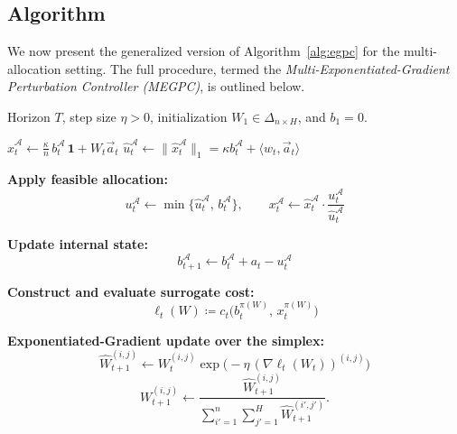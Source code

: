 \documentclass[11pt]{article}
\begin{document}
\subsection{Algorithm}

We now present the generalized version of Algorithm~\ref{alg:egpc} for the multi-allocation setting.  
The full procedure, termed the \emph{Multi-Exponentiated-Gradient Perturbation Controller (MEGPC)}, is outlined below.

\begin{algorithm}
\caption{Multi-Exponentiated-Gradient Perturbation Controller (MEGPC)}
\label{alg:megpc}
\begin{algorithmic}[1]
\Require Horizon \(T\), step size \(\eta > 0\), initialization \(W_1 \in \Delta_{n\times H}\), and \(b_1 = 0\).


    \State 
    \(
        \widehat{x}_t^{\mathcal{A}} 
        \gets
        \frac{\kappa}{n}\, b_t^{\mathcal{A}}\, \mathbf{1}
        +
        W_t \vec{a}_t
    \)
    \State
    \(
        \widehat{u}_t^{\mathcal{A}} 
        \gets
        \|\widehat{x}_t^{\mathcal{A}}\|_1
        =
        \kappa b_t^{\mathcal{A}} + \langle w_t , \vec{a}_t\rangle
    \)

    \State \textbf{Apply feasible allocation:}
    \[
        u_t^{\mathcal{A}} \gets \min\{\widehat{u}_t^{\mathcal{A}},\, b_t^{\mathcal{A}}\},
        \qquad
        x_t^{\mathcal{A}} \gets
        \widehat{x}_t^{\mathcal{A}} \cdot
        \frac{u_t^{\mathcal{A}}}{\widehat{u}_t^{\mathcal{A}}}
    \]

    \State \textbf{Update internal state:}
    \[
        b_{t+1}^{\mathcal{A}} \gets b_t^{\mathcal{A}} + a_t - u_t^{\mathcal{A}}
    \]

    \State \textbf{Construct and evaluate surrogate cost:}
    \[
        \ell_t(W)
        \coloneqq
        c_t\!\bigl(b_t^{\pi(W)},\,x_t^{\pi(W)}\bigr)
    \]

    \State \textbf{Exponentiated-Gradient update over the simplex:}
        \[
            \widehat{W}_{t+1}^{(i,j)} 
            \gets
            W_t^{(i,j)} 
            \exp\!\big(-\eta\, (\nabla \ell_t(W_t))^{(i,j)}\big)
        \]
    \EndFor
    \[
        W_{t+1}^{(i,j)} 
        \gets
        \frac{\widehat{W}_{t+1}^{(i,j)}}
        {\sum_{i'=1}^n \sum_{j'=1}^H \widehat{W}_{t+1}^{(i',j')}}.
    \]
\EndFor
\end{algorithmic}
\end{algorithm}
\end{document}
